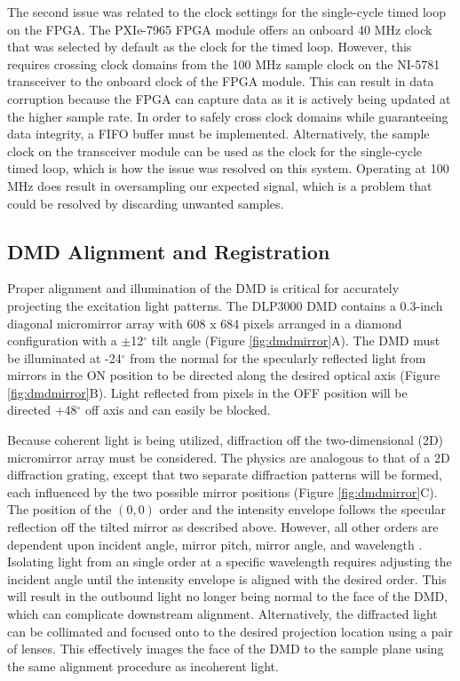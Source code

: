 The second issue was related to the clock settings for the single-cycle timed loop on the FPGA. The PXIe-7965 FPGA module offers an onboard 40 MHz clock that was selected by default as the clock for the timed loop. However, this requires crossing clock domains from the 100 MHz sample clock on the NI-5781 transceiver to the onboard clock of the FPGA module. This can result in data corruption because the FPGA can capture data as it is actively being updated at the higher sample rate. In order to safely cross clock domains while guaranteeing data integrity, a FIFO buffer must be implemented. Alternatively, the sample clock on the transceiver module can be used as the clock for the single-cycle timed loop, which is how the issue was resolved on this system. Operating at 100 MHz does result in oversampling our expected signal, which is a problem that could be resolved by discarding unwanted samples.

\subsection{DMD Alignment and Registration} \label{ssec:dmd_registration}

Proper alignment and illumination of the DMD is critical for accurately projecting the excitation light patterns. The DLP3000 DMD contains a 0.3-inch diagonal micromirror array with 608 x 684 pixels arranged in a diamond configuration with a $\pm$12$^\circ$ tilt angle (Figure \ref{fig:dmdmirror}A). The DMD must be illuminated at -24$^\circ$ from the normal for the specularly reflected light from mirrors in the ON position to be directed along the desired optical axis (Figure \ref{fig:dmdmirror}B). Light reflected from pixels in the OFF position will be directed +48$^\circ$ off axis and can easily be blocked.

Because coherent light is being utilized, diffraction off the two-dimensional (2D) micromirror array must be considered. The physics are analogous to that of a 2D diffraction grating, except that two separate diffraction patterns will be formed, each influenced by the two possible mirror positions (Figure \ref{fig:dmdmirror}C). The position of the $(0,0)$ order and the intensity envelope follows the specular reflection off the tilted mirror as described above. However, all other orders are dependent upon incident angle, mirror pitch, mirror angle, and wavelength \cite{TexasInstruments:2009tr}. Isolating light from an single order at a specific wavelength requires adjusting the incident angle until the intensity envelope is aligned with the desired order. This will result in the outbound light no longer being normal to the face of the DMD, which can complicate downstream alignment. Alternatively, the diffracted light can be collimated and focused onto to the desired projection location using a pair of lenses. This effectively images the face of the DMD to the sample plane using the same alignment procedure as incoherent light.

